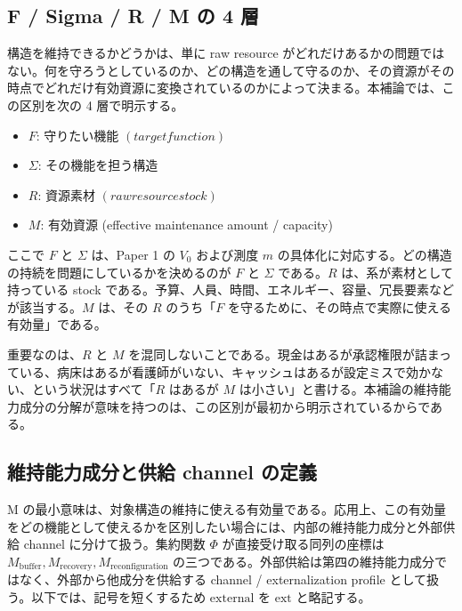 \documentclass[12pt,a4paper]{article}
\begin{document}
\subsection{F / Sigma / R / M の 4 層}\label{f-sigma-r-m-ux306e-4-ux5c64}

構造を維持できるかどうかは、単に raw resource がどれだけあるかの問題ではない。何を守ろうとしているのか、どの構造を通して守るのか、その資源がその時点でどれだけ有効資源に変換されているのかによって決まる。本補論では、この区別を次の 4 層で明示する。

\begin{itemize}
\tightlist
\item
  \(F\): 守りたい機能 \((target function)\)
\item
  \(\Sigma\): その機能を担う構造
\item
  \(R\): 資源素材 \((raw resource stock)\)
\item
  \(M\): 有効資源 (effective maintenance amount / capacity)
\end{itemize}

ここで \(F\) と \(\Sigma\) は、Paper 1 の \(V_0\) および測度 \(m\) の具体化に対応する。どの構造の持続を問題にしているかを決めるのが \(F\) と \(\Sigma\) である。\(R\) は、系が素材として持っている stock である。予算、人員、時間、エネルギー、容量、冗長要素などが該当する。\(M\) は、その \(R\) のうち「\(F\) を守るために、その時点で実際に使える有効量」である。

重要なのは、\(R\) と \(M\) を混同しないことである。現金はあるが承認権限が詰まっている、病床はあるが看護師がいない、キャッシュはあるが設定ミスで効かない、という状況はすべて「\(R\) はあるが \(M\) は小さい」と書ける。本補論の維持能力成分の分解が意味を持つのは、この区別が最初から明示されているからである。

\subsection{維持能力成分と供給 channel の定義}\label{ux7dadux6301ux80fdux529bux6210ux5206ux3068ux4f9bux7d66-channel-ux306eux5b9aux7fa9}

M の最小意味は、対象構造の維持に使える有効量である。応用上、この有効量をどの機能として使えるかを区別したい場合には、内部の維持能力成分と外部供給 channel に分けて扱う。集約関数 \(\Phi\) が直接受け取る同列の座標は \(M_{\mathrm{buffer}}, M_{\mathrm{recovery}}, M_{\mathrm{reconfiguration}}\) の三つである。外部供給は第四の維持能力成分ではなく、外部から他成分を供給する channel / externalization profile として扱う。以下では、記号を短くするため \(\mathrm{external}\) を \(\mathrm{ext}\) と略記する。
\end{document}
